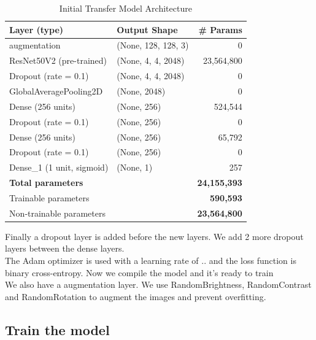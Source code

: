 \documentclass[conference]{IEEEtran}
\begin{document}
\begin{table}[htbp]
	\caption{Initial Transfer Model Architecture}
	\label{table:cnn_overview}
	\centering
	\begin{adjustbox}{width=0.48\textwidth}
		\begin{tabular}{|l|l|r|}
			\hline
			\textbf{Layer (type)} & \textbf{Output Shape} & \textbf{\# Params} \\
			\hline
			augmentation                   & (None, 128, 128, 3)    &      0  \\
			ResNet50V2 (pre-trained)       & (None, 4, 4, 2048)     & 23,564,800\\
			Dropout (rate = 0.1)           & (None, 4, 4, 2048)     &      0  \\
			GlobalAveragePooling2D         & (None, 2048)           &      0  \\
			Dense (256 units)              & (None, 256)            & 524,544\\
			Dropout (rate = 0.1)           & (None, 256)            &      0  \\
			Dense (256 units)              & (None, 256)            & 65,792\\
			Dropout (rate = 0.1)           & (None, 256)            &      0  \\
			Dense\_1 (1 unit, sigmoid)     & (None, 1)              &     257 \\
			\hline
			\multicolumn{2}{|l|}{\textbf{Total parameters}} & \textbf{24,155,393} \\
			\multicolumn{2}{|l|}{Trainable parameters}       & \textbf{590,593} \\
			\multicolumn{2}{|l|}{Non‑trainable parameters}   & \textbf{23,564,800}\\
			\hline
		\end{tabular}
	\end{adjustbox}
\end{table}

Finally a dropout layer is added before the new layers. We add 2 more dropout layers between the dense layers.\\
The Adam optimizer is used with a learning rate of .. and the loss function is binary cross-entropy.
Now we compile the model and it's ready to train\\

We also have a augmentation layer. We use RandomBrightness, RandomContrast and RandomRotation to augment the images and prevent overfitting.

\subsection{Train the model}
\end{document}
